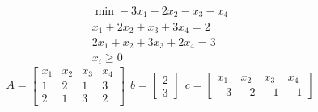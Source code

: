 \Es
\begin{gather*}
\min -3x_{1} -2x_{2} -x_{3} -x_{4}\\
x_{1} +2x_{2} +x_{3} +3x_{4} =2\\
2x_{1} +x_{2} +3x_{3} +2x_{4} =3\\
x_{i} \geq 0
\end{gather*}
\begin{equation*}
A=\begin{bmatrix}
x_{1} & x_{2} & x_{3} & x_{4}\\
1 & 2 & 1 & 3\\
2 & 1 & 3 & 2
\end{bmatrix} \ \ b=\begin{bmatrix}
2\\
3
\end{bmatrix} \ \ c=\begin{bmatrix}
x_{1} & x_{2} & x_{3} & x_{4}\\
-3 & -2 & -1 & -1
\end{bmatrix}
\end{equation*}
